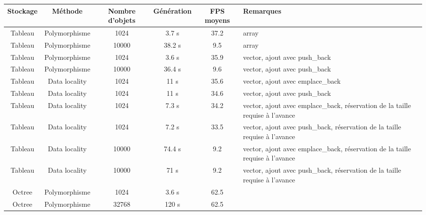\documentclass[a4paper,french,12pt]{article}
\begin{document}
      \begin{center}

	\label{optimisations}


	\begin{tabular}{| c | c | c | c | c | p{4cm} |}
	    \hline
	    Stockage & Méthode & Nombre d'objets & Génération & FPS moyens & Remarques \\ \hline

	    Tableau & Polymorphisme & 1024 & 3.7 s & 37.2  & array\\ \hline
	    Tableau & Polymorphisme & 10000 & 38.2 s & 9.5  & array\\ \hline

	    Tableau & Polymorphisme & 1024 & 3.6 s & 35.9  & vector, ajout avec push\_back \\ \hline

	    Tableau & Polymorphisme & 10000 & 36.4 s & 9.6  & vector, ajout avec push\_back \\ \hline


	    Tableau & Data locality & 1024 & 11 s & 35.6  & vector, ajout avec emplace\_back\\ \hline
	    Tableau & Data locality & 1024 & 11 s & 34.6  & vector, ajout avec push\_back\\ \hline


	    Tableau & Data locality & 1024 & 7.3 s & 34.2  & vector, ajout avec emplace\_back, réservation de la taille
								    requise à l'avance\\ \hline
	    Tableau & Data locality & 1024 & 7.2 s & 33.5  & vector, ajout avec push\_back, réservation de la taille
								    requise à l'avance \\ \hline


	    Tableau & Data locality & 10000 & 74.4 s & 9.2  & vector, ajout avec emplace\_back, réservation de la taille
								    requise à l'avance\\ \hline
	    Tableau & Data locality & 10000 & 71 s & 9.2  & vector, ajout avec push\_back, réservation de la taille
								    requise à l'avance\\ \hline


	    Octree & Polymorphisme & 1024 & 3.6 s & 62.5 & \\ \hline
	    Octree & Polymorphisme & 32768 & 120 s & 62.5 & \\ \hline

	    \hline
	\end{tabular}
      \end{center}
\end{document}
